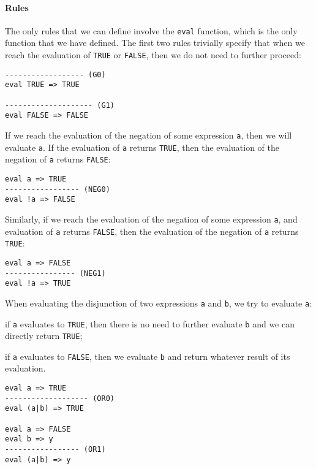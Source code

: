\paragraph{Rules}
The only rules that we can define involve the \texttt{eval} function, which is the only function that we have defined. The first two rules  trivially specify that when we reach the evaluation of \texttt{TRUE} or \texttt{FALSE}, then we do not need to further proceed:

\begin{lstlisting}
------------------ (G0)
eval TRUE => TRUE

-------------------- (G1)
eval FALSE => FALSE
\end{lstlisting}

If we reach the evaluation of the negation of some expression \texttt{a}, then we will evaluate \texttt{a}. If the evaluation of \texttt{a} returns \texttt{TRUE}, then the evaluation of the negation of \texttt{a} returns \texttt{FALSE}:

\begin{lstlisting}
eval a => TRUE
----------------- (NEG0)
eval !a => FALSE
\end{lstlisting}

Similarly, if we reach the evaluation of the negation of some expression \texttt{a}, and evaluation of \texttt{a} returns \texttt{FALSE}, then the evaluation of the negation of \texttt{a} returns \texttt{TRUE}:

\begin{lstlisting}
eval a => FALSE
---------------- (NEG1)
eval !a => TRUE
\end{lstlisting}

When evaluating the disjunction of two expressions \texttt{a} and \texttt{b}, we try to evaluate \texttt{a}:
\begin{inparaenum}
\item if \texttt{a} evaluates to \texttt{TRUE}, then there is no need to further evaluate \texttt{b} and we can directly return \texttt{TRUE};
\item if \texttt{a} evaluates to \texttt{FALSE}, then we evaluate \texttt{b} and return whatever result of its evaluation.
\end{inparaenum}

\begin{lstlisting}
eval a => TRUE
------------------- (OR0)
eval (a|b) => TRUE

eval a => FALSE
eval b => y
----------------- (OR1)
eval (a|b) => y
\end{lstlisting}

